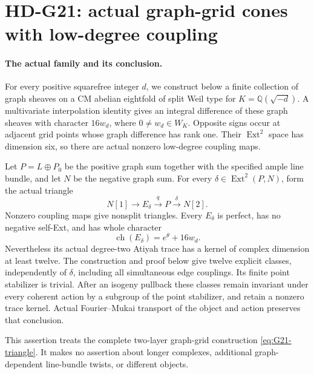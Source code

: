 \section{HD-G21: actual graph-grid cones with low-degree coupling}
\label{sec:clean-grid-cones}

\paragraph{The actual family and its conclusion.}
For every positive squarefree integer \(d\), we construct below a
finite collection of graph sheaves on a CM abelian eightfold of split
Weil type for \(K=\mathbb Q(\sqrt{-d})\). A multivariate interpolation
identity gives an integral difference of these graph sheaves with
character \(16w_d\), where \(0\ne w_d\in W_K\). Opposite signs
occur at adjacent grid points whose graph difference has rank one.
Their \(\operatorname{Ext}^2\) space has dimension six, so there are
actual nonzero low-degree coupling maps.

Let \(P=L\oplus P_0\) be the positive graph sum together with the
specified ample line bundle, and let \(N\) be the negative graph sum.
For every \(\delta\in\operatorname{Ext}^2(P,N)\), form the actual
triangle
\begin{equation}\label{eq:G21-triangle}
 N[1]\longrightarrow E_\delta\xrightarrow{q}P
                     \xrightarrow{\delta}N[2].
\end{equation}
Nonzero coupling maps give nonsplit triangles. Every \(E_\delta\)
is perfect, has no negative self-Ext, and has whole character
\[
                 \operatorname{ch}(E_\delta)=e^\theta+16w_d.
\]
Nevertheless its actual degree-two Atiyah trace has a kernel of
complex dimension at least twelve. The construction and proof below
give twelve explicit classes, independently of \(\delta\), including
all simultaneous edge couplings. Its finite point stabilizer is trivial.
After an isogeny pullback these classes remain invariant under every
coherent action by a subgroup of the point stabilizer, and retain a
nonzero trace kernel. Actual Fourier--Mukai transport of the object
and action preserves that conclusion.

This assertion treats the complete two-layer graph-grid construction
\eqref{eq:G21-triangle}. It makes no assertion about longer complexes,
additional graph-dependent line-bundle twists, or different objects.

